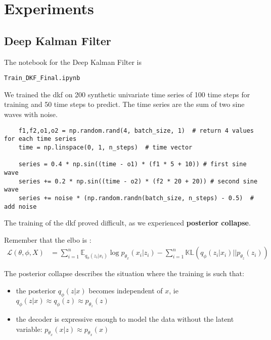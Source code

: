 \chapter{Experiments}

\section{Deep Kalman Filter}

The notebook for the Deep Kalman Filter is 

\begin{verbatim}
Train_DKF_Final.ipynb
\end{verbatim}

We trained the \gls{dkf} on 200 synthetic univariate time series of 100 time steps for training and 50 time steps to predict. 
The time series are the sum of two sine waves with noise.

\begin{verbatim}
    f1,f2,o1,o2 = np.random.rand(4, batch_size, 1)  # return 4 values for each time series
    time = np.linspace(0, 1, n_steps)  # time vector
    
    series = 0.4 * np.sin((time - o1) * (f1 * 5 + 10)) # first sine wave
    series += 0.2 * np.sin((time - o2) * (f2 * 20 + 20)) # second sine wave
    series += noise * (np.random.randn(batch_size, n_steps) - 0.5)  # add noise
\end{verbatim}

The training of the \gls{dkf} proved difficult, as we experienced \textbf{posterior collapse}.

Remember that the \gls{elbo} is :
\begin{align*}
    \mathcal{L}(\theta, \phi, X) &= \sum_{i=1}^n \mathbb{E}_{q_{\phi}(z_i \vert x_i)} \log{p_{\theta_x}(x_i \vert z_i)} - \sum_{i=1}^n \mathbb{KL}(q_{\phi}(z_i \vert x_i) \vert\vert p_{\theta_z}(z_i) )
\end{align*}

The posterior collapse describes the situation where the training is such that:
\begin{itemize}
    \item the posterior $q_{\phi}(z \vert x)$ becomes independent of $x$, ie $q_{\phi}(z \vert x) \approx q_{\phi}(z) \approx p_{\theta_z}(z)$
    \item the decoder is expressive enough to model the data without the latent variable: $p_{\theta_x}(x \vert z) \approx p_{\theta_x}(x)$
\end{itemize}

